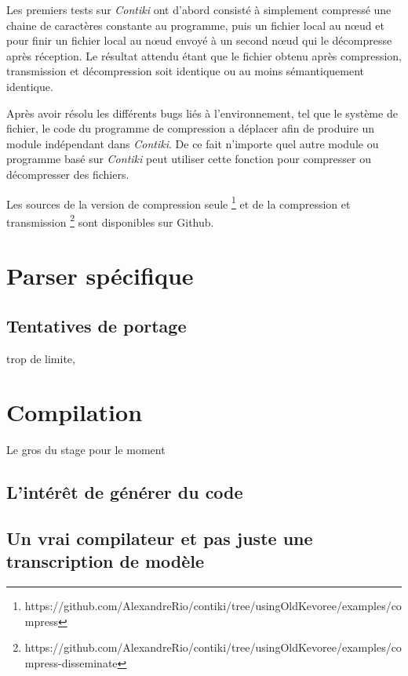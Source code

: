 Les premiers tests sur \emph{Contiki} ont d'abord consisté à simplement compressé une   chaine de caractères constante au programme, puis un fichier local au nœud et pour finir un fichier local au nœud envoyé à un second nœud qui le décompresse après réception. Le résultat attendu étant que le fichier obtenu après compression, transmission et décompression soit identique ou au moins sémantiquement identique.

Après avoir résolu les différents bugs liés à l'environnement, tel que le système de fichier, le code du programme de compression a déplacer afin de produire un module indépendant dans \emph{Contiki}. De ce fait n'importe quel autre module ou programme basé sur \emph{Contiki} peut utiliser cette fonction pour compresser ou décompresser des fichiers.

Les sources de la version de compression seule \footnote{https://github.com/AlexandreRio/contiki/tree/usingOldKevoree/examples/compress} et de la compression et transmission \footnote{https://github.com/AlexandreRio/contiki/tree/usingOldKevoree/examples/compress-disseminate} sont disponibles sur Github.

\section{Parser spécifique}

\subsection{Tentatives de portage}

trop de limite,
\section{Compilation}

Le gros du stage pour le moment

\subsection{L'intérêt de générer du code}

\subsection{Un vrai compilateur et pas juste une transcription de modèle}